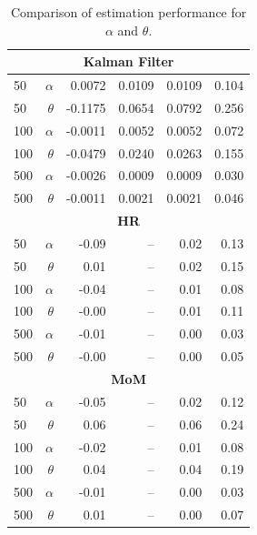 \documentclass[12pt]{article}
\begin{document}
\begin{enumerate}[label=\alph*.]
\begin{table}[htbp]
\begin{tabular}{lrrrrr}
        \multicolumn{6}{c}{\textbf{Kalman Filter}} \\
        \midrule
        50  & $\alpha$ &  0.0072 & 0.0109 & 0.0109 & 0.104 \\
        50  & $\theta$ & -0.1175 & 0.0654 & 0.0792 & 0.256 \\
        
        100 & $\alpha$ & -0.0011 & 0.0052 & 0.0052 & 0.072 \\
        100 & $\theta$ & -0.0479 & 0.0240 & 0.0263 & 0.155 \\
        
        500 & $\alpha$ & -0.0026 & 0.0009 & 0.0009 & 0.030 \\
        500 & $\theta$ & -0.0011 & 0.0021 & 0.0021 & 0.046 \\
        
        \midrule
        \multicolumn{6}{c}{\textbf{HR}} \\
        \midrule
        50  & $\alpha$ & -0.09 & -- & 0.02 & 0.13 \\
        50  & $\theta$ &  0.01 & -- & 0.02 & 0.15 \\
        
        100 & $\alpha$ & -0.04 & -- & 0.01 & 0.08 \\
        100 & $\theta$ & -0.00 & -- & 0.01 & 0.11 \\
        
        500 & $\alpha$ & -0.01 & -- & 0.00 & 0.03 \\
        500 & $\theta$ & -0.00 & -- & 0.00 & 0.05 \\
        
        \midrule
        \multicolumn{6}{c}{\textbf{MoM}} \\
        \midrule
        50  & $\alpha$ & -0.05 & -- & 0.02 & 0.12 \\
        50  & $\theta$ &  0.06 & -- & 0.06 & 0.24 \\
        
        100 & $\alpha$ & -0.02 & -- & 0.01 & 0.08 \\
        100 & $\theta$ &  0.04 & -- & 0.04 & 0.19 \\
        
        500 & $\alpha$ & -0.01 & -- & 0.00 & 0.03 \\
        500 & $\theta$ &  0.01 & -- & 0.00 & 0.07 \\
        
        \bottomrule
        \end{tabular}
        \caption{Comparison of estimation performance for $\alpha$ and $\theta$.}
        \label{tab:2c}
        \end{table}
\end{enumerate}
\end{document}
